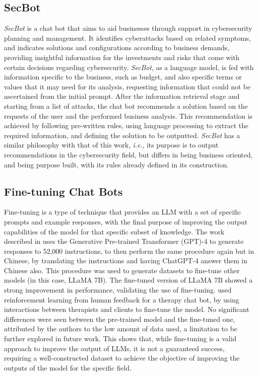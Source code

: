 \documentclass[sigconf]{acmart}
\begin{document}
\subsection{SecBot}
\textit{SecBot} \cite{Franco20, Shaqiri21} is a chat bot that aims to aid businesses through support in cybersecurity planning and management. It identifies cyberattacks based on related symptoms, and indicates solutions and configurations according to business demands, providing insightful information for the investments and risks that come with certain decisions regarding cybersecurity. \textit{SecBot}, as a language model, is fed with information specific to the business, such as budget, and also specific terms or values that it may need for its analysis, requesting information that could not be ascertained from the initial prompt. After the information retrieval stage and starting from a list of attacks, the chat bot recommends a solution based on the requests of the user and the performed business analysis. This recommendation is achieved by following pre-written rules, using language processing to extract the required information, and defining the solution to be outputted. \textit{SecBot} has a similar philosophy with that of this work, \textit{i.e.}, its purpose is to output recommendations in the cybersecurity field, but differs in being business oriented, and being purpose built, with its rules already defined in its construction.

\subsection{Fine-tuning Chat Bots}
Fine-tuning is a type of technique that provides an LLM with a set of specific prompts and example responses, with the final purpose of improving the output capabilities of the model for that specific subset of knowledge. The work described in \cite{Peng23} uses the Generative Pre-trained Transformer (GPT)-4 to generate responses to 52,000 instructions, to then perform the same procedure again but in Chinese, by translating the instructions and having ChatGPT-4 answer them in Chinese also. This procedure was used to generate datasets to fine-tune other models (in this case, LLaMA 7B). The fine-tuned version of LLaMA 7B showed a strong improvement in performance, validating the use of fine-tuning. \cite{Bill23} used reinforcement learning from human feedback for a therapy chat bot, by using interactions between therapists and clients to fine-tune the model. No significant differences were seen between the pre-trained model and the fine-tuned one, attributed by the authors to the low amount of data used, a limitation to be further explored in future work. This shows that, while fine-tuning is a valid approach to improve the output of LLMs, it is not a guaranteed success, requiring a well-constructed dataset to achieve the objective of improving the outputs of the model for the specific field.
\end{document}
